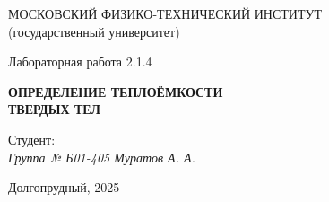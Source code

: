 \thispagestyle{empty}

\begin{center}
    МОСКОВСКИЙ ФИЗИКО-ТЕХНИЧЕСКИЙ ИНСТИТУТ \\
    (государственный университет)
\end{center}

\vfill

\begin{center}
    Лабораторная работа 2.1.4 \\ 
    \vspace{20pt}
    
    \textbf{ОПРЕДЕЛЕНИЕ ТЕПЛОЁМКОСТИ} \\
    \textbf{ТВЕРДЫХ ТЕЛ}
\end{center}  

\vfill

    \noindent Студент: \\
    \textit{Группа № Б01-405 \hfill Муратов А. А.}

\vfill

\begin{center}
    Долгопрудный, 2025
\end{center}